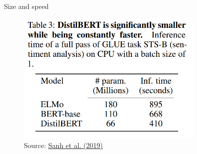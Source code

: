\begin{frame}{Size and speed}

\vfill

	\begin{figure}
		\centering
		\includegraphics[width = 9cm]{figure/distilbert-size-speed.png}\\ 
		\footnotesize{Source:} \href{https://arxiv.org/pdf/1910.01108.pdf}{\footnotesize Sanh et al. (2019)}
	\end{figure}

\vfill
	
\end{frame}


\endlecture

